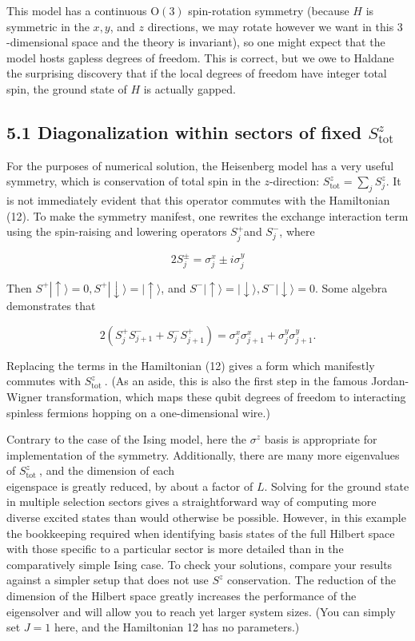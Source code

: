\documentclass[12pt]{article}
\begin{document}
This model has a continuous $\mathrm{O}(3)$ spin-rotation symmetry (because $H$ is symmetric in the $x, y$, and $z$ directions, we may rotate however we want in this 3 -dimensional space and the theory is invariant), so one might expect that the model hosts gapless degrees of freedom. This is correct, but we owe to Haldane the surprising discovery that if the local degrees of freedom have integer total spin, the ground state of $H$ is actually gapped.

\subsection*{5.1 Diagonalization within sectors of fixed $S_{\text {tot }}^{z}$}
For the purposes of numerical solution, the Heisenberg model has a very useful symmetry, which is conservation of total spin in the $z$-direction: $S_{\mathrm{tot}}^{z}=\sum_{j} S_{j}^{z}$. It is not immediately evident that this operator commutes with the Hamiltonian (12). To make the symmetry manifest, one rewrites the exchange interaction term using the spin-raising and lowering operators $S_{j}^{+}$and $S_{j}^{-}$, where


\begin{equation*}
2 S_{j}^{ \pm}=\sigma_{j}^{x} \pm i \sigma_{j}^{y} \tag{13}
\end{equation*}


Then $S^{+}|\uparrow\rangle=0, S^{+}|\downarrow\rangle=|\uparrow\rangle$, and $S^{-}|\uparrow\rangle=|\downarrow\rangle, S^{-}|\downarrow\rangle=0$. Some algebra demonstrates that


\begin{equation*}
2\left(S_{j}^{+} S_{j+1}^{-}+S_{j}^{-} S_{j+1}^{+}\right)=\sigma_{j}^{x} \sigma_{j+1}^{x}+\sigma_{j}^{y} \sigma_{j+1}^{y} . \tag{14}
\end{equation*}


Replacing the terms in the Hamiltonian (12) gives a form which manifestly commutes with $S_{\text {tot }}^{z}$. (As an aside, this is also the first step in the famous Jordan-Wigner transformation, which maps these qubit degrees of freedom to interacting spinless fermions hopping on a one-dimensional wire.)

Contrary to the case of the Ising model, here the $\sigma^{z}$ basis is appropriate for implementation of the symmetry. Additionally, there are many more eigenvalues of $S_{\text {tot }}^{z}$, and the dimension of each\\
eigenspace is greatly reduced, by about a factor of $L$. Solving for the ground state in multiple selection sectors gives a straightforward way of computing more diverse excited states than would otherwise be possible. However, in this example the bookkeeping required when identifying basis states of the full Hilbert space with those specific to a particular sector is more detailed than in the comparatively simple Ising case. To check your solutions, compare your results against a simpler setup that does not use $S^{z}$ conservation. The reduction of the dimension of the Hilbert space greatly increases the performance of the eigensolver and will allow you to reach yet larger system sizes. (You can simply set $J=1$ here, and the Hamiltonian 12 has no parameters.)
\end{document}

